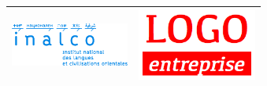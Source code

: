 
\thispagestyle{empty}

\begin{center}
  \begin{tabularx}{\textwidth}{m{10.3cm}m{4cm}}
	 \includegraphics[width = 3.9cm]{logo-inalco} %
	&
	 \includegraphics[width = 3.9cm]{logo-entreprise} %
        \\ \hline
  \end{tabularx}
\end{center}

